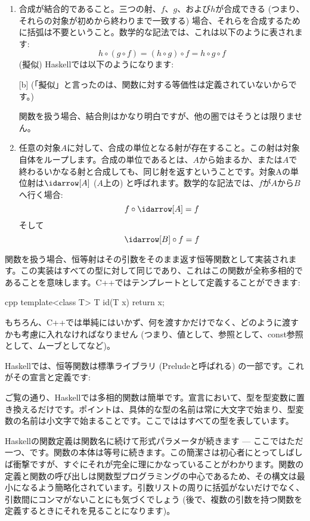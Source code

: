 \begin{enumerate}
  \item
        合成が結合的であること。三つの射、$f$、$g$、および$h$が合成できる (つまり、それらの対象が初めから終わりまで一致する) 場合、それらを合成するために括弧は不要ということ。数学的な記法では、これは以下のように表されます:
        \[h \circ (g \circ f) = (h \circ g) \circ f = h \circ g \circ f\]
        (擬似) Haskellでは以下のようになります:

        [b]
        (「擬似」と言ったのは、関数に対する等価性は定義されていないからです。)

        関数を扱う場合、結合則はかなり明白ですが、他の圏ではそうとは限りません。

  \item
        任意の対象$A$に対して、合成の単位となる射が存在すること。この射は対象自体をループします。合成の単位であるとは、$A$から始まるか、または$A$で終わるいかなる射と合成しても、同じ射を返すということです。対象Aの単位射は$\idarrow[A]$ ($A$上の) と呼ばれます。数学的な記法では、$f$が$A$から$B$へ行く場合:
        \[f \circ \idarrow[A] = f\]
        そして
        \[\idarrow[B] \circ f = f\]
\end{enumerate}
関数を扱う場合、恒等射はその引数をそのまま返す恒等関数として実装されます。この実装はすべての型に対して同じであり、これはこの関数が全称多相的であることを意味します。C++ではテンプレートとして定義することができます:

\begin{snip}{cpp}
template<class T> T id(T x) { return x; }
\end{snip}
もちろん、C++では単純にはいかず、何を渡すかだけでなく、どのように渡すかも考慮に入れなければなりません (つまり、値として、参照として、const参照として、ムーブとしてなど)。

Haskellでは、恒等関数は標準ライブラリ (Preludeと呼ばれる) の一部です。これがその宣言と定義です:

ご覧の通り、Haskellでは多相的関数は簡単です。宣言において、型を型変数に置き換えるだけです。ポイントは、具体的な型の名前は常に大文字で始まり、型変数の名前は小文字で始まることです。ここでははすべての型を表しています。

Haskellの関数定義は関数名に続けて形式パラメータが続きます --- ここではただ一つ、です。関数の本体は等号に続きます。この簡潔さは初心者にとってしばしば衝撃ですが、すぐにそれが完全に理にかなっていることがわかります。関数の定義と関数の呼び出しは関数型プログラミングの中心であるため、その構文は最小になるよう簡略化されています。引数リストの周りに括弧がないだけでなく、引数間にコンマがないことにも気づくでしょう (後で、複数の引数を持つ関数を定義するときにそれを見ることになります)。

